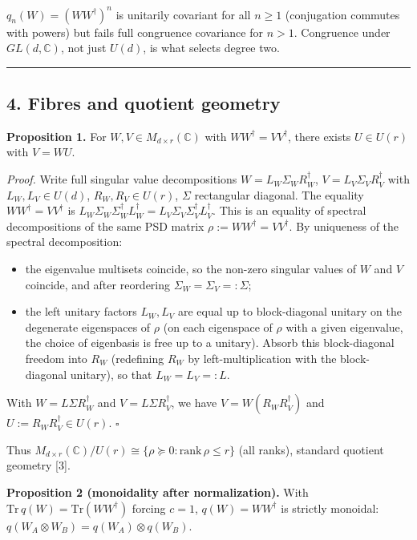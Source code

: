 \documentclass[
]{article}
\providecommand{\tightlist}{%
  \setlength{\itemsep}{0pt}\setlength{\parskip}{0pt}}
\begin{document}
\(q_n(W)=(WW^\dagger)^n\) is unitarily covariant for all \(n\geq 1\)
(conjugation commutes with powers) but fails full congruence covariance
for \(n>1\). Congruence under \(GL(d,\mathbb C)\), not just \(U(d)\), is
what selects degree two.

\begin{center}\rule{0.5\linewidth}{0.5pt}\end{center}

\subsection{4. Fibres and quotient
geometry}\label{fibres-and-quotient-geometry}

\textbf{Proposition 1.} For \(W,V\in M_{d\times r}(\mathbb C)\) with
\(WW^\dagger=VV^\dagger\), there exists \(U\in U(r)\) with \(V=WU\).

\emph{Proof.} Write full singular value decompositions
\(W=L_W\Sigma_W R_W^\dagger\), \(V=L_V\Sigma_V R_V^\dagger\) with
\(L_W,L_V\in U(d)\), \(R_W,R_V\in U(r)\), \(\Sigma\) rectangular
diagonal. The equality \(WW^\dagger=VV^\dagger\) is
\(L_W\Sigma_W\Sigma_W^\dagger L_W^\dagger=L_V\Sigma_V\Sigma_V^\dagger L_V^\dagger\).
This is an equality of spectral decompositions of the same PSD matrix
\(\rho:=WW^\dagger=VV^\dagger\). By uniqueness of the spectral
decomposition:

\begin{itemize}
\tightlist
\item
  the eigenvalue multisets coincide, so the non-zero singular values of
  \(W\) and \(V\) coincide, and after reordering
  \(\Sigma_W=\Sigma_V=:\Sigma\);
\item
  the left unitary factors \(L_W,L_V\) are equal up to block-diagonal
  unitary on the degenerate eigenspaces of \(\rho\) (on each eigenspace
  of \(\rho\) with a given eigenvalue, the choice of eigenbasis is free
  up to a unitary). Absorb this block-diagonal freedom into \(R_W\)
  (redefining \(R_W\) by left-multiplication with the block-diagonal
  unitary), so that \(L_W=L_V=:L\).
\end{itemize}

With \(W=L\Sigma R_W^\dagger\) and \(V=L\Sigma R_V^\dagger\), we have
\(V=W(R_WR_V^\dagger)\) and \(U:=R_WR_V^\dagger\in U(r)\). \(\square\)

Thus
\(M_{d\times r}(\mathbb C)/U(r)\cong\{\rho\succeq 0:\mathrm{rank}\,\rho\leq r\}\)
(all ranks), standard quotient geometry {[}3{]}.

\textbf{Proposition 2 (monoidality after normalization).} With
\(\mathrm{Tr}\,q(W)=\mathrm{Tr}(WW^\dagger)\) forcing \(c=1\),
\(q(W)=WW^\dagger\) is strictly monoidal:
\(q(W_A\otimes W_B)=q(W_A)\otimes q(W_B)\).
\end{document}
